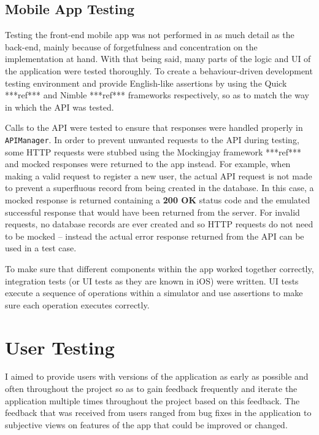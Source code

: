 \subsection{Mobile App Testing}

Testing the front-end mobile app was not performed in as much detail as the back-end, mainly because of forgetfulness and concentration on the implementation at hand. With that being said, many parts of the logic and UI of the application were tested thoroughly. To create a behaviour-driven development testing environment and provide English-like assertions by using the Quick ***ref*** and Nimble ***ref*** frameworks respectively, so as to match the way in which the API was tested.

Calls to the API were tested to ensure that responses were handled properly in \verb|APIManager|. In order to prevent unwanted requests to the API during testing, some HTTP requests were stubbed using the Mockingjay framework ***ref*** and mocked responses were returned to the app instead. For example, when making a valid request to register a new user, the actual API request is not made to prevent a superfluous record from being created in the database. In this case, a mocked response is returned containing a \textbf{200 OK} status code and the emulated successful response that would have been returned from the server. For invalid requests, no database records are ever created and so HTTP requests do not need to be mocked -- instead the actual error response returned from the API can be used in a test case.

To make sure that different components within the app worked together correctly, integration tests (or UI tests as they are known in iOS) were written. UI tests execute a sequence of operations within a simulator and use assertions to make sure each operation executes correctly.



\section{User Testing}

I aimed to provide users with versions of the application as early as possible and often throughout the project so as to gain feedback frequently and iterate the application multiple times throughout the project based on this feedback. The feedback that was received from users ranged from bug fixes in the application to subjective views on features of the app that could be improved or changed.


